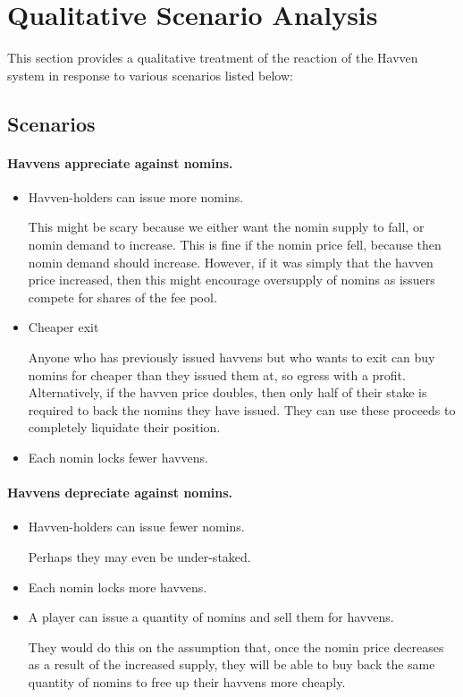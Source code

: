 
\section{Qualitative Scenario Analysis}

This section provides a qualitative treatment of the reaction of the Havven system in response to various scenarios listed below:


\subsection{Scenarios}

\paragraph{Havvens appreciate against nomins.}
\begin{itemize}
	\item{Havven-holders can issue more nomins.}

	This might be scary because we either want the nomin supply to fall, or nomin demand to increase.
	This is fine if the nomin price fell, because then nomin demand should increase.
	However, if it was simply that the havven price increased, then this might encourage
	oversupply of nomins as issuers compete for shares of the fee pool.

	\item{Cheaper exit}

	Anyone who has previously issued havvens but who wants to exit can buy nomins for
	cheaper than they issued them at, so egress with a profit.
	Alternatively, if the havven price doubles, then only half of their stake is required
	to back the nomins they have issued. They can use these proceeds to completely liquidate
	their position.

	\item{Each nomin locks fewer havvens.}
	
\end{itemize}

\paragraph{Havvens depreciate against nomins.}
\begin{itemize}
	\item{Havven-holders can issue fewer nomins.}
	
	Perhaps they may even be under-staked.

	\item{Each nomin locks more havvens.}
	\item{A player can issue a quantity of nomins and sell them for havvens.}
		  
	They would do this on the assumption that, once the nomin price decreases as a result of the increased
	supply, they will be able to buy back the same quantity of nomins to free up their
	havvens more cheaply.
\end{itemize}

